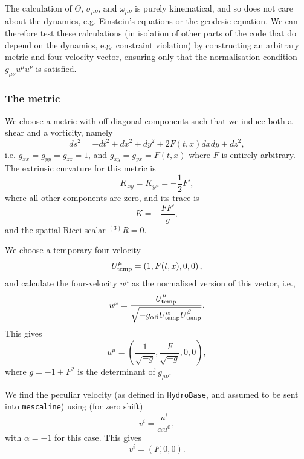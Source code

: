 \documentclass[a4paper]{article}
\newcommand{\mesc}{\texttt{mescaline}}
\begin{document}
The calculation of $\Theta$, $\sigma_{\mu\nu}$, and $\omega_{\mu\nu}$ is purely kinematical, and so does not care about the dynamics, e.g. Einstein's equations or the geodesic equation. We can therefore test these calculations (in isolation of other parts of the code that do depend on the dynamics, e.g. constraint violation) by constructing an arbitrary metric and four-velocity vector, ensuring only that the normalisation condition $g_{\mu\nu} u^\mu u^\nu$ is satisfied. 

\subsubsection{The metric}

We choose a metric with off-diagonal components such that we induce both a shear and a vorticity, namely
\begin{equation}
	ds^2 = - dt^2 + dx^2 + dy^2 + 2 F(t,x) dx dy + dz^2,
\end{equation}
i.e. $g_{xx}=g_{yy}=g_{zz}=1$, and $g_{xy}=g_{yx}=F(t,x)$ where $F$ is entirely arbitrary. The extrinsic curvature for this metric is
\begin{equation}
	K_{xy} = K_{yx} = - \frac{1}{2} F',
\end{equation}
where all other components are zero, and its trace is
\begin{equation}
	K = - \frac{F F'}{g},
\end{equation}
and the spatial Ricci scalar ${}^{(3)}R=0$.

We choose a temporary four-velocity
\begin{equation}
	U^\mu_{\rm temp} = \left(1, F(t,x), 0, 0\right),
\end{equation}
and calculate the four-velocity $u^\mu$ as the normalised version of this vector, i.e.,
\begin{equation}
	u^\mu = \frac{U^\mu_{\rm temp} }{\sqrt{-g_{\alpha\beta}U^\alpha_{\rm temp} U^\beta_{\rm temp}}}.
\end{equation}
This gives
\begin{equation}
	u^\mu = \left( \frac{1}{\sqrt{ -g }}, \frac{F}{\sqrt{ -g }}, 0, 0 \right),
\end{equation}
where $g=-1+ F^2$ is the determinant of $g_{\mu\nu}$.

We find the peculiar velocity (as defined in \texttt{HydroBase}, and assumed to be sent into \mesc) using (for zero shift)
\begin{equation}
	v^i = \frac{u^i}{\alpha u^0},
\end{equation}
with $\alpha=-1$ for this case. This gives
\begin{equation}
	v^i = (F, 0, 0).
\end{equation}
\end{document}
